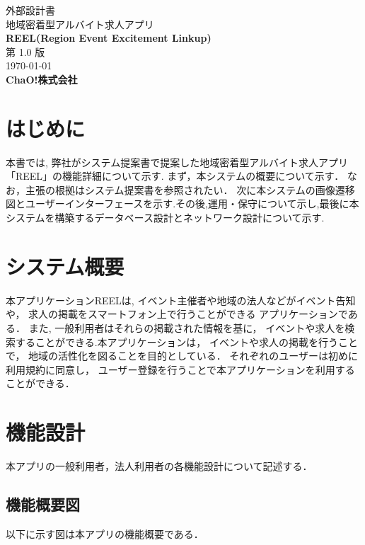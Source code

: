 \documentclass[a4paper,dvipdfmx]{jarticle}
\begin{document}
\begin{titlepage}
  \centering
  \LARGE
  外部設計書
  \\\vspace{1cm}
  地域密着型アルバイト求人アプリ\\
  \textbf{REEL(Region Event Excitement Linkup)}
  \\\vspace{4cm}
  第 1.0 版
  \\\vspace{4cm}
  \today
  \\\vspace{2.5cm}
  \textbf{ChaO!株式会社}
\end{titlepage}
\tableofcontents
\newpage
\section{はじめに}
本書では, 弊社がシステム提案書で提案した地域密着型アルバイト求人アプリ「REEL」の機能詳細について示す.
まず，本システムの概要について示す．
なお，主張の根拠はシステム提案書を参照されたい．
次に本システムの画像遷移図とユーザーインターフェースを示す.その後,運用・保守について示し,最後に本システムを構築するデータベース設計とネットワーク設計について示す.


\section{システム概要}
本アプリケーションREELは,
イベント主催者や地域の法人などがイベント告知や，
求人の掲載をスマートフォン上で行うことができる
アプリケーションである．
また, 一般利用者はそれらの掲載された情報を基に，
イベントや求人を検索することができる.本アプリケーションは，
イベントや求人の掲載を行うことで，
地域の活性化を図ることを目的としている．
それぞれのユーザーは初めに利用規約に同意し，
ユーザー登録を行うことで本アプリケーションを利用することができる．\par




\clearpage
\section{機能設計}
本アプリの一般利用者，法人利用者の各機能設計について記述する．\par

\subsection{機能概要図}
以下に示す図は本アプリの機能概要である．\par
\end{document}
